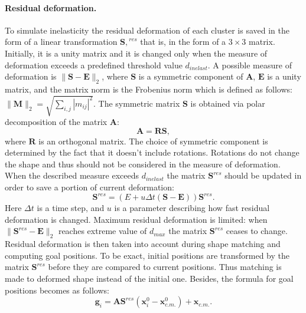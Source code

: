 \documentclass[a4paper, 12pt, titlepage]{extarticle}
\newcommand{\vect}[1]{\mathbf{#1}} %
\newcommand{\matx}[1]{\mathbf{#1}} %
\begin{document}
        \paragraph{Residual deformation.} To simulate inelasticity the residual deformation of each
        cluster is saved in the form of a linear transformation $\matx{S,}^{\!\!res}$ that is, in the
        form of a $3 \times 3$ matrix. Initially, it is a unity matrix and it is changed only when
        the measure of deformation exceeds a predefined threshold value $d_{inelast}$. A possible
        measure of deformation is $ \|\matx S - \matx E\|_2 $, where $\matx S$ is a symmetric
        component of $\matx A$, $\matx E$ is a unity matrix, and the matrix norm is the Frobenius
        norm which is defined as follows: $\|\matx M\|_2 = \sqrt{\sum_{i, j} |m_{ij}|^2}$. The
        symmetric matrix $\matx S$ is obtained via polar decomposition of the matrix $\matx A$:
        \begin{equation}\label{eq:polar_decomposition}
          \matx A = \matx R \matx S,
        \end{equation}
        where $\matx R$ is an orthogonal matrix. The choice of symmetric component is determined by
        the fact that it doesn't include rotations. Rotations do not change the shape and thus should
        not be considered in the measure of deformation. When the described measure exceeds $d_{inelast}$
        the matrix $\matx{S}^{res}$ should be updated in order to save a portion of current deformation:
        \begin{equation}
          \matx{S}^{res} = \left(E + u \Delta t (\matx S - \matx E) \right) \matx{S}^{res}.
        \end{equation}
        Here $\Delta t$ is a time step, and $u$ is a parameter describing how fast residual
        deformation is changed. Maximum residual deformation is limited: when
        $\|\matx{S}^{res} - \matx E\|_2$ reaches extreme value of $d_{max}$ the matrix
        $\matx{S}^{res}$ ceases to change. Residual deformation is then taken into account during
        shape matching and computing goal positions. To be exact, initial positions are transformed
        by the matrix $\matx{S}^{res}$ before they are compared to current positions. Thus
        matching is made to deformed shape instead of the initial one. Besides, the formula for goal
        positions becomes as follows:
        \begin{equation}\label{eq:goal_pos}
          \vect{g}_i = \matx{A} \matx{S}^{res} (\vect{x}^0_i - \vect{x}^0_{c.m.}) + \vect{x}_{c.m.}.
        \end{equation}
\end{document}

